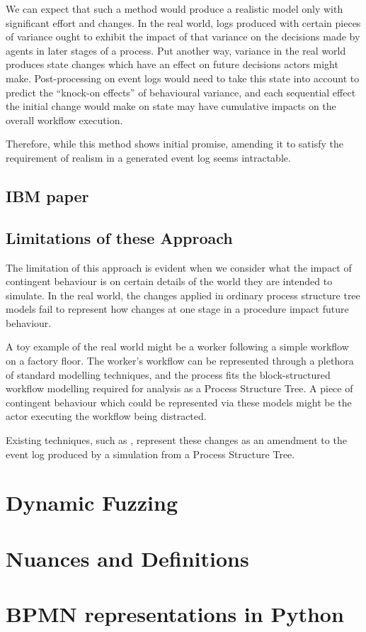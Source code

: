 \documentclass[12pt,draft]{article}
\begin{document}
We can expect that such a method would produce a realistic model only with
significant effort and changes. In the real world, logs produced with certain
pieces of variance ought to exhibit the impact of that variance on the decisions
made by agents in later stages of a process. Put another way, variance in the
real world produces state changes which have an effect on future decisions
actors might make. Post-processing on event logs would need to take this state
into account to predict the ``knock-on effects'' of behavioural variance, and
each sequential effect the initial change would make on state may have
cumulative impacts on the overall workflow execution.
\par

Therefore, while this method shows initial promise, amending it to satisfy the
requirement of realism in a generated event log seems intractable.
\par

\subsection{IBM paper}  %

\subsection{Limitations of these Approach}
The limitation of this approach is evident when we consider what the impact of
contingent behaviour is on certain details of the world they are intended to
simulate. In the real world, the changes applied in ordinary process structure
tree models fail to represent how changes at one stage in a procedure impact
future behaviour.\par

A toy example of the real world might be a worker following a simple workflow on
a factory floor. The worker's workflow can be represented through a plethora of
standard modelling techniques, and the process fits the block-structured
workflow modelling required for analysis as a Process Structure Tree. A piece of
contingent behaviour which could be represented via these models might be the
actor executing the workflow being distracted.\par

Existing techniques, such as , represent these changes as an
amendment to the event log produced by a simulation from a Process Structure
Tree. \par




\section{Dynamic Fuzzing}


\section{Nuances and Definitions}



\section{BPMN representations in Python}
\end{document}
